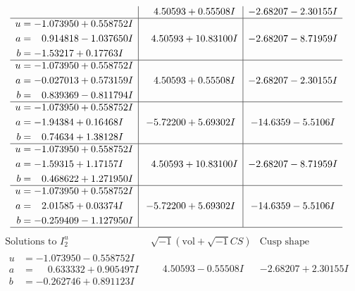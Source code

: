 \documentclass[1p]{elsarticle_modified}
\theoremstyle{definition}
\newcommand{\I}{\sqrt{-1}}
\begin{document}
$$\begin{array}{c|c|c}
 & \phantom{-}4.50593 + 0.55508 I & -2.68207 - 2.30155 I \\ \hline\begin{aligned}
u &= -1.073950 + 0.558752 I \\
a &= \phantom{-}0.914818 - 1.037650 I \\
b &= -1.53217 + 0.17763 I\end{aligned}
 & \phantom{-}4.50593 + 10.83100 I & -2.68207 - 8.71959 I \\ \hline\begin{aligned}
u &= -1.073950 + 0.558752 I \\
a &= -0.027013 + 0.573159 I \\
b &= \phantom{-}0.839369 - 0.811794 I\end{aligned}
 & \phantom{-}4.50593 + 0.55508 I & -2.68207 - 2.30155 I \\ \hline\begin{aligned}
u &= -1.073950 + 0.558752 I \\
a &= -1.94384 + 0.16468 I \\
b &= \phantom{-}0.74634 + 1.38128 I\end{aligned}
 & -5.72200 + 5.69302 I & -14.6359 - 5.5106 I \\ \hline\begin{aligned}
u &= -1.073950 + 0.558752 I \\
a &= -1.59315 + 1.17157 I \\
b &= \phantom{-}0.468622 + 1.271950 I\end{aligned}
 & \phantom{-}4.50593 + 10.83100 I & -2.68207 - 8.71959 I \\ \hline\begin{aligned}
u &= -1.073950 + 0.558752 I \\
a &= \phantom{-}2.01585 + 0.03374 I \\
b &= -0.259409 - 1.127950 I\end{aligned}
 & -5.72200 + 5.69302 I & -14.6359 - 5.5106 I\\
 \hline 
 \end{array}$$\newpage$$\begin{array}{c|c|c}  
\text{Solutions to }I^u_{2}& \I (\text{vol} + \sqrt{-1}CS) & \text{Cusp shape}\\
 \hline 
\begin{aligned}
u &= -1.073950 - 0.558752 I \\
a &= \phantom{-}0.633332 + 0.905497 I \\
b &= -0.262746 + 0.891123 I\end{aligned}
 & \phantom{-}4.50593 - 0.55508 I & -2.68207 + 2.30155 I \\ \hline\begin{aligned}

\end{aligned}
\end{array}$$
\end{document}
